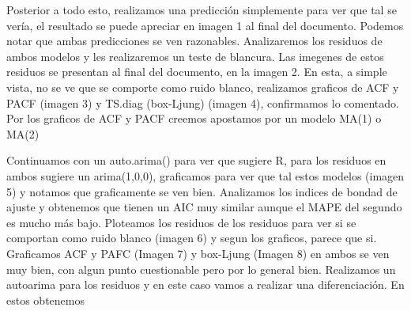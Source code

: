 \documentclass[10pt,A4]{article}
\begin{document}
    Posterior a todo esto, realizamos una predicción simplemente para ver que tal se vería, el resultado se puede apreciar en imagen 1 al final del documento. Podemos notar que ambas predicciones se ven razonables. Analizaremos los residuos de ambos modelos y les realizaremos un teste de blancura. Las imegenes de estos residuos se presentan al final del documento, en la imagen 2. En esta, a simple vista, no se ve que se comporte como ruido blanco, realizamos graficos de ACF y PACF (imagen 3) y TS.diag (box-Ljung) (imagen 4), confirmamos lo comentado. Por los graficos de ACF y PACF creemos apostamos por un modelo MA(1) o MA(2)

    Continuamos con un auto.arima() para ver que sugiere R, para los residuos en ambos sugiere un arima(1,0,0), graficamos para ver que tal estos modelos (imagen 5) y notamos que graficamente se ven bien. Analizamos los indices de bondad de ajuste y obtenemos que tienen un AIC muy similar aunque el MAPE del segundo es mucho más bajo. Ploteamos los residuos de los residuos para ver si se comportan como ruido blanco (imagen 6) y segun los graficos, parece que si. Graficamos ACF y PAFC (Imagen 7) y box-Ljung (Imagen 8) en ambos se ven muy bien, con algun punto cuestionable pero por lo general bien. Realizamos un autoarima para los residuos y en este caso vamos a realizar una diferenciación. En estos obtenemos 



    
\end{document}
